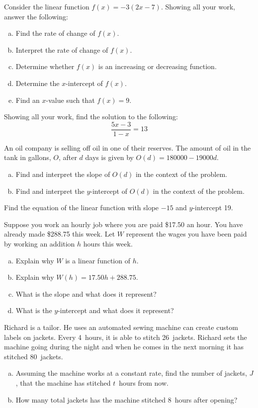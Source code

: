 \documentclass[11pt,letterpaper]{article}
\begin{document}
\prob Consider the linear function $f(x)= -3(2x - 7)$. Showing all your work, answer the following:
	\begin{enumerate}[(a)]
	\item Find the rate of change of $f(x)$.
	\item Interpret the rate of change of $f(x)$. 
	\item Determine whether $f(x)$ is an increasing or decreasing function.
	\item Determine the $x$-intercept of $f(x)$.
	\item Find an $x$-value such that $f(x)= 9$.
	\end{enumerate} \pspace


\prob Showing all your work, find the solution to the following:
	\[
	\dfrac{5x - 3}{1 - x}= 13
	\] \pspace


\prob An oil company is selling off oil in one of their reserves. The amount of oil in the tank in gallons, $O$, after $d$ days is given by $O(d)= 180000 - 19000d$.
	\begin{enumerate}[(a)]
	\item Find and interpret the slope of $O(d)$ in the context of the problem. 
	\item Find and interpret the $y$-intercept of $O(d)$ in the context of the problem. 
	\end{enumerate} \pspace


\prob Find the equation of the linear function with slope $-15$ and $y$-intercept 19. \pspace	


\prob Suppose you work an hourly job where you are paid \$17.50 an hour. You have already made \$288.75 this week. Let $W$ represent the wages you have been paid by working an addition $h$ hours this week.
	\begin{enumerate}[(a)]
	\item Explain why $W$ is a linear function of $h$. 
	\item Explain why $W(h)= 17.50h + 288.75$.
	\item What is the slope and what does it represent?
	\item What is the $y$-intercept and what does it represent?
	\end{enumerate} \pspace
	

\prob	 Richard is a tailor. He uses an automated sewing machine can create custom labels on jackets. Every 4~hours, it is able to stitch 26~jackets. Richard sets the machine going during the night and when he comes in the next morning it has stitched 80~jackets.
	\begin{enumerate}[(a)]
	\item Assuming the machine works at a constant rate, find the number of jackets, $J$, that the machine has stitched $t$~hours from now.
	\item How many total jackets has the machine stitched 8~hours after opening?
	\end{enumerate} \pspace 	
	
\end{document}
